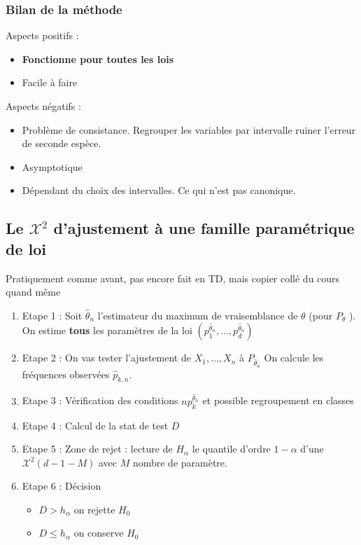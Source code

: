 \documentclass{article}
\theoremstyle{plain}%
\theoremstyle{definition}
\theoremstyle{remark}
\begin{document}
\subsubsection*{Bilan de la méthode}
Aspects positifs : 
\begin{itemize}
    \item \textbf{Fonctionne pour toutes les lois}
    \item Facile à faire
\end{itemize}

Aspects négatifs : 
\begin{itemize}
    \item Problème de consistance. Regrouper les variables par intervalle ruiner l'erreur de seconde espèce.
    \item Asymptotique
    \item Dépendant du choix des intervalles. Ce qui n'est pas canonique.
\end{itemize}

\subsection{Le $ \mathcal{X}^2 $ d'ajustement à une famille paramétrique de loi}
Pratiquement comme avant, pas encore fait en TD, mais copier collé du cours quand même 
\begin{enumerate}
    \item Etape 1 : Soit $ \hat{\theta }_n $ l'estimateur du maximum de vraisemblance de $ \theta  $ (pour $ P_\theta  $ ). On estime \textbf{tous} les paramètres de la loi $ (p_1^{\hat{\theta }_n}, \dots, p_d^{\hat{\theta }_n}) $ 
    \item Etape 2 : On vas tester l'ajustement de $ X_1, \dots, X_n $ à $ P_{\hat{\theta }_n} $ On calcule les fréquences observées $ \hat{p}_{k,n} $.
    \item Etape 3 : Vérification des conditions $ np_k^{\hat{\theta }_n} $ et possible regroupement en classes 
    \item Etape 4 : Calcul de la stat de test $ D $ 
    \item Etape 5 : Zone de rejet : lecture de $ H_\alpha  $ le quantile d'ordre $ 1-\alpha  $ d'une $ \mathcal{X}^2(d-1-M) $ avec $ M $ nombre de paramètre. 
    \item Etape 6 : Décision 
        \begin{itemize}
            \item $ D > h_\alpha  $ on rejette $ H_0 $ 
            \item $ D \leq h_\alpha  $ on conserve $ H_0 $ 
        \end{itemize}
\end{enumerate}
\end{document}

